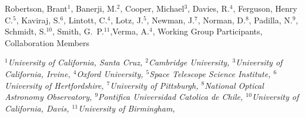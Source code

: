 Robertson, Brant$^{1}$, Banerji, M.$^{2}$, Cooper, Michael$^{3}$, Davies, R.$^{4}$, Ferguson, Henry C.$^{5}$, Kaviraj, S.$^{6}$, Lintott, C.$^{4}$, Lotz, J.$^{5}$, Newman, J.$^{7}$, Norman, D.$^{8}$, Padilla, N.$^{9}$, Schmidt, S.$^{10}$, Smith, G.~P.$^{11}$,Verma, A.$^{4}$, Working Group Participants, Collaboration Members

\vspace*{5mm}

{\centering\it\small
$^{1}$University of California, Santa Cruz,
$^{2}$Cambridge University,
$^{3}$University of California, Irvine,
$^{4}$Oxford University,
$^{5}$Space Telescope Science Institute,
$^{6}$University of Hertfordshire,
$^{7}$University of Pittsburgh,
$^{8}$National Optical Astronomy Observatory,
$^{9}$Pontifica Universidad Catolica de Chile,
$^{10}$University of California, Davis,
$^{11}$University of Birmingham,
}
